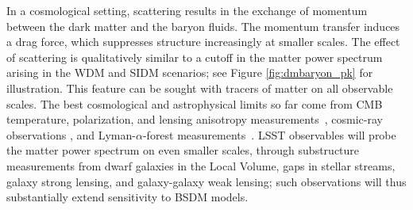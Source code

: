 In a cosmological setting, scattering results in the exchange of momentum between the dark matter and the baryon fluids.
The momentum transfer induces a drag force, which suppresses structure increasingly at smaller scales. 
The effect of scattering is qualitatively similar to a cutoff in the matter power spectrum arising in the WDM and SIDM scenarios; see Figure \ref{fig:dmbaryon_pk} for illustration.
This feature can be sought with tracers of matter on all observable scales. 
The best cosmological and astrophysical limits so far come from CMB temperature, polarization, and lensing anisotropy measurements~\citep{Xu:2018efh,Boddy:2018kfv,Gluscevic:2017ywp,Boddy:2018wzy,Slatyer:2018aqg}, cosmic-ray observations \citep{Cappiello:2018hsu}, and Lyman-$\alpha$-forest measurements~\citep{Dvorkin:2013cea,Xu:2018efh}. 
LSST observables will probe the matter power spectrum on even smaller scales, through substructure measurements from dwarf galaxies in the Local Volume, gaps in stellar streams, galaxy strong lensing,  and galaxy-galaxy weak lensing; such observations will thus substantially extend sensitivity to BSDM models.  

